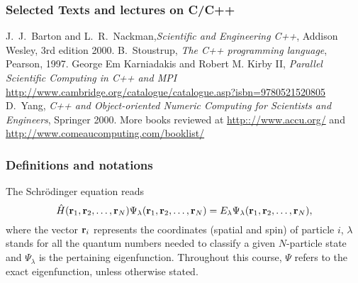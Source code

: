 \documentclass[compress]{beamer}
\begin{document}
\frame
{
  \frametitle<presentation>{Selected Texts and lectures on C/C++}
 \begin{small}
 {\scriptsize

  \beamertemplatebookbibitems

  \begin{thebibliography}{10}
    J.~J.~Barton and L.~R.~Nackman,{\em Scientific and Engineering C++}, Addison Wesley, 3rd edition 2000.
    B.~Stoustrup, {\em The C++ programming language}, Pearson, 1997. 
   George Em Karniadakis and Robert M. Kirby II, {\em Parallel Scientific Computing in C++ and MPI}  \url{http://www.cambridge.org/catalogue/catalogue.asp?isbn=9780521520805}
    D.~Yang, {\em C++ and Object-oriented Numeric Computing for
Scientists and Engineers}, Springer 2000.
 More books reviewed at \url{http:://www.accu.org/} and 
\url{http://www.comeaucomputing.com/booklist/}
\end{thebibliography}
 }
 \end{small}
}


\frame
{
  \frametitle{Definitions and notations}
\begin{small}
{\scriptsize
The Schr\"odinger equation reads 
\begin{equation}
\hat{H}({\bf r}_1, {\bf r}_2, \hdots , {\bf r}_N) \Psi_{\lambda}({\bf r}_1, {\bf r}_2, \dots , {\bf r}_N) = 
E_\lambda  \Psi_\lambda({\bf r}_1, {\bf r}_2, \hdots , {\bf r}_N), 
\label{eq:basicSE1}
\end{equation}
where the vector ${\bf r}_i$ represents the coordinates (spatial and spin) of particle  $i$, $\lambda$ stands  for all the quantum
numbers needed to classify a given $N$-particle  state and $\Psi_{\lambda}$ is the pertaining eigenfunction.  Throughout this course,
$\Psi$ refers to the exact eigenfunction, unless otherwise stated.
}
\end{small}
}
\end{document}
